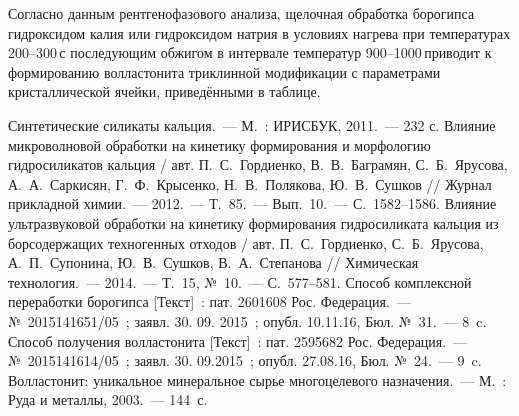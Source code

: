 Согласно данным рентгенофазового анализа, щелочная обработка борогипса гидроксидом калия или гидроксидом натрия в условиях нагрева при температурах 200--300\,\dgc с последующим обжигом в интервале температур 900--1000\,\dgc приводит к формированию волластонита триклинной модификации с параметрами кристаллической ячейки, приведёнными в таблице.


\begin{thebibliography}{99}
\bibitem{} Синтетические силикаты кальция.~--- М.~: ИРИСБУК, 2011.~--- 232 с.
\bibitem{} Влияние микроволновой обработки на кинетику формирования и морфологию гидросиликатов кальция / авт. П.~С.~Гордиенко, В.~В.~Баграмян, С.~Б.~Ярусова, А.~А.~Саркисян, Г.~Ф.~Крысенко, Н.~В.~Полякова, Ю.~В.~Сушков // Журнал прикладной химии.~--- 2012.~--- Т.~85.~--- Вып.~10.~--- С.~1582--1586.
\bibitem{} Влияние ультразвуковой обработки на кинетику формирования гидросиликата кальция из борсодержащих техногенных отходов / авт. П.~С.~Гордиенко, С.~Б.~Ярусова, А.~П.~Супонина, Ю.~В.~Сушков, В.~А.~Степанова // Химическая технология.~--- 2014.~--- Т.~15, №~10.~--- С.~577--581.
\bibitem{}Способ комплексной переработки борогипса [Текст]~: пат. 2601608 Рос. Федерация.~--- №~2015141651/05~; заявл. 30. 09. 2015~; опубл. 10.11.16, Бюл. №~31.~--- 8~c.
\bibitem{}Способ получения волластонита [Текст]~: пат. 2595682 Рос. Федерация.~--- №~2015141614/05~; заявл. 30. 09.2015~; опубл. 27.08.16, Бюл. №~24.~--- 9~c.
\bibitem{} Волластонит: уникальное минеральное сырье многоцелевого назначения.~--- М.~: Руда и металлы, 2003.~--- 144~с.

\end{thebibliography}
